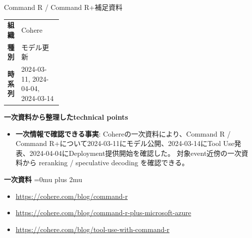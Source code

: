 \begin{technicalnote}{Command R / Command R+}{補足資料}
\begingroup
\begin{tabularx}{\linewidth}{@{}>{\bfseries}p{0.22\linewidth}X@{}}
組織 & Cohere \\
種別 & モデル更新 \\
時系列 & 2024-03-11, 2024-04-04, 2024-03-14 \\
\end{tabularx}
\smallskip
{\bfseries 一次資料から整理したtechnical points}
\begin{itemize}[leftmargin=1.5em,itemsep=0.35em]
\item \textbf{一次情報で確認できる事実}: Cohereの一次資料により、Command R / Command R+について2024-03-11にモデル公開、2024-03-14にTool Use発表、2024-04-04にDeployment提供開始を確認した。 対象event近傍の一次資料から reranking / speculative decoding を確認できる。
\end{itemize}
\begin{minipage}{\linewidth}
\begin{samepage}
{\bfseries 一次資料}
\begingroup\sloppy
\Urlmuskip=0mu plus 2mu\relax
\begin{itemize}[leftmargin=1.5em,itemsep=0.25em]
\item {\scriptsize\url{https://cohere.com/blog/command-r}}
\item {\scriptsize\url{https://cohere.com/blog/command-r-plus-microsoft-azure}}
\item {\scriptsize\url{https://cohere.com/blog/tool-use-with-command-r}}
\end{itemize}
\endgroup
\end{samepage}
\end{minipage}
\endgroup
\end{technicalnote}
\medskip

